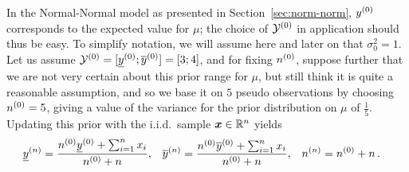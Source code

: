 \begin{example}
\label{ex:ymodel-nv}
In the Normal-Normal model as presented in Section~\ref{sec:norm-norm},
$y^{(0)}$ corresponds to the expected value for $\mu$; the choice of $\mathcal{Y}^{(0)}$ in application should thus be easy.
To simplify notation, we will assume here and later on that $\sigma^2_0 = 1$.
Let us assume $\mathcal{Y}^{(0)} = [\underline{y}^{(0)} ; \overline{y}^{(0)}] = [3;4]$, and for fixing
$n^{(0)}$, suppose further that we are not very certain about
this prior range for $\mu$, but still think it is quite a reasonable
assumption, and so we base it on $5$ pseudo observations by choosing $n^{(0)}=5$,
giving a value of the variance for the prior distribution on $\mu$ of $\frac{1}{5}$.
%
%
Updating this prior with the i.i.d.\ sample ${\bm x} \in \mathbb{R}^n$ yields%
\begin{align*} %
\ynl &= \frac{\nz\yzl + \sum_{i=1}^n x_i}{\nz + n}, &%
\ynu &= \frac{\nz\yzu + \sum_{i=1}^n x_i}{\nz + n}, &%
\nn &= \nz + n\,.%
\end{align*}


\end{example}
